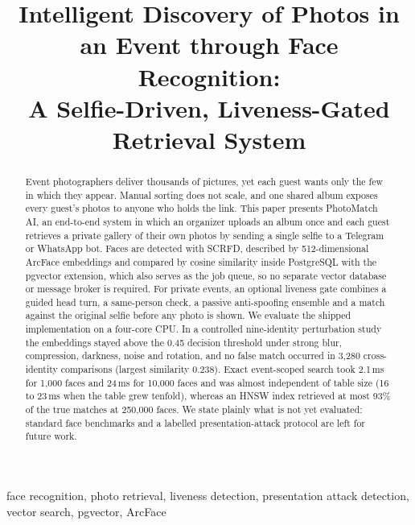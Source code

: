 \documentclass[conference]{IEEEtran}
\begin{document}
\title{Intelligent Discovery of Photos in an Event through Face Recognition:\\
A Selfie-Driven, Liveness-Gated Retrieval System}

\author{
}

\maketitle

\begin{abstract}
Event photographers deliver thousands of pictures, yet each guest wants only the few in which they appear. Manual sorting does not scale, and one shared album exposes every guest's photos to anyone who holds the link. This paper presents PhotoMatch AI, an end-to-end system in which an organizer uploads an album once and each guest retrieves a private gallery of their own photos by sending a single selfie to a Telegram or WhatsApp bot. Faces are detected with SCRFD, described by 512-dimensional ArcFace embeddings and compared by cosine similarity inside PostgreSQL with the pgvector extension, which also serves as the job queue, so no separate vector database or message broker is required. For private events, an optional liveness gate combines a guided head turn, a same-person check, a passive anti-spoofing ensemble and a match against the original selfie before any photo is shown. We evaluate the shipped implementation on a four-core CPU. In a controlled nine-identity perturbation study the embeddings stayed above the 0.45 decision threshold under strong blur, compression, darkness, noise and rotation, and no false match occurred in 3{,}280 cross-identity comparisons (largest similarity 0.238). Exact event-scoped search took 2.1\,ms for 1{,}000 faces and 24\,ms for 10{,}000 faces and was almost independent of table size (16 to 23\,ms when the table grew tenfold), whereas an HNSW index retrieved at most 93\% of the true matches at 250{,}000 faces. We state plainly what is not yet evaluated: standard face benchmarks and a labelled presentation-attack protocol are left for future work.
\end{abstract}

\begin{IEEEkeywords}
face recognition, photo retrieval, liveness detection, presentation attack detection, vector search, pgvector, ArcFace
\end{IEEEkeywords}
\end{document}
